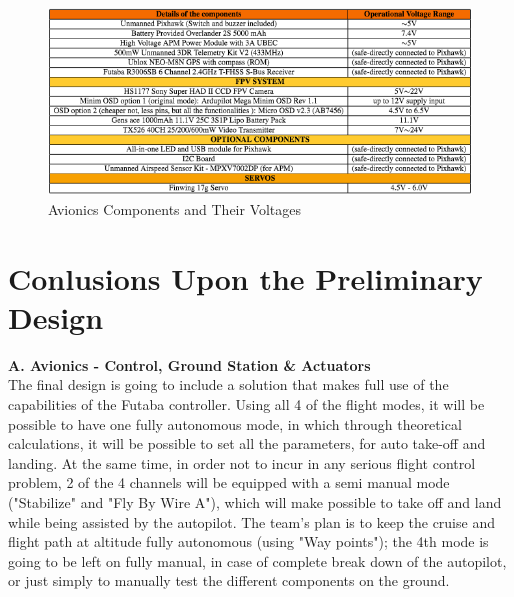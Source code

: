 \documentclass[12pt]{article}
\begin{document}
\begin{figure}[h!]
\includegraphics[width=18cm, scale=1]{Hamzatable.png}
\caption{Avionics Components and Their Voltages}
\end{figure}

\section{Conlusions Upon the Preliminary Design}

\textbf{A. Avionics - Control, Ground Station \& Actuators}\\
\noindent The final design is going to include a solution that makes full use of the capabilities of the Futaba controller. Using all 4 of the flight modes, it will be possible to have one fully autonomous mode, in which   through theoretical calculations, it will be possible to set all the parameters, for auto take-off and landing. At the same time, in order not to incur in any serious flight control problem, 2 of the 4 channels will be equipped with a semi manual mode ("Stabilize" and "Fly By Wire A"), which will make possible to take off and land while being assisted by the autopilot. The team's plan is to keep the cruise and flight path at altitude fully autonomous (using "Way points"); the 4th mode is going to be left on fully manual, in case of complete break down of the autopilot, or just simply to manually test the different components on the ground.\\
\end{document}

